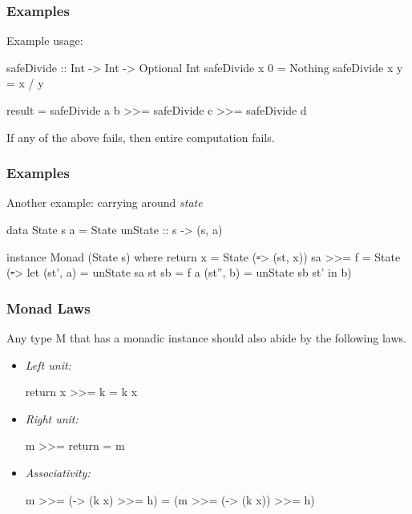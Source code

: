 \documentclass{beamer}
\begin{document}

\begin{frame}[fragile]
\frametitle{Examples}

Example usage:

\begin{code}
safeDivide :: Int -> Int -> Optional Int
safeDivide x 0 = Nothing
safeDivide x y = x / y

result = safeDivide a b >>= safeDivide c
                        >>= safeDivide d
\end{code}

If any of the above fails, then entire computation fails.

\end{frame}


\begin{frame}[fragile]
\frametitle{Examples}

Another example: carrying around \emph{state}

\begin{code}
data State s a = State { unState :: s -> (s, a) }

instance Monad (State s) where
  return x = State (\st -> (st, x))
  sa >>= f = State (\st -> let (st', a)  = unState sa st
                               sb        = f a
                               (st'', b) = unState sb st'
                           in b)
\end{code}

\end{frame}


\begin{frame}[fragile]
\frametitle{Monad Laws}

Any type M that has a monadic instance should also abide by the following
laws.

\begin{itemize}
  \item \emph{Left unit:}
    \begin{code}
      return x >>= k = k x
    \end{code}

  \item \emph{Right unit:}
    \begin{code}
      m >>= return = m
    \end{code}

  \item \emph{Associativity:}
    \begin{code}
      m >>= (\x -> (k x) >>= h)
        = (m >>= (\x -> (k x)) >>= h)
    \end{code}

\end{itemize}

\end{frame}
\end{document}
